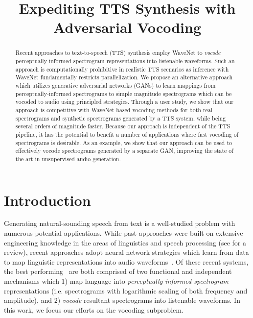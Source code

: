 \documentclass[a4paper]{article}
\title{Expediting TTS Synthesis with Adversarial Vocoding}
\begin{document}
\maketitle
% 
\begin{abstract}
Recent approaches to text-to-speech (TTS) synthesis employ WaveNet to \emph{vocode} perceptually-informed spectrogram representations into listenable waveforms. 
Such an approach is computationally prohibitive in realistic TTS scenarios as inference with WaveNet fundamentally restricts parallelization. 
We propose an alternative approach which utilizes generative adversarial networks (GANs) to learn mappings from perceptually-informed spectrograms to simple magnitude spectrograms which can be vocoded to audio using principled strategies. 
Through a user study, we show that our approach is competitive with WaveNet-based vocoding methods for both real spectrograms and synthetic spectrograms generated by a TTS system, while being several orders of magnitude faster. 
Because our approach is independent of the TTS pipeline, it has the potential to benefit a number of applications where fast vocoding of spectrograms is desirable. 
As an example, we show that our approach can be used to effectively vocode spectrograms generated by a separate GAN, improving the state of the art in unsupervised audio generation.
\end{abstract}


\section{Introduction}

Generating natural-sounding speech from text is a well-studied problem with numerous potential applications. 
While past approaches were built on extensive engineering knowledge in the areas of linguistics and speech processing  (see \cite{} for a review), 
recent approaches adopt neural network strategies which learn from data to map linguistic representations into audio waveforms~\cite{arik2017deep,gibiansky2017deep,ping2017deep,wang2017tacotron,shen2018natural}. 
Of these recent systems, 
the best performing~\cite{ping2017deep,shen2018natural} are both comprised of two functional and independent mechanisms which 
1) map language into \emph{perceptually-informed spectrogram} representations (i.e. spectrograms with logarithmic scaling of both frequency and amplitude), and 
2) \emph{vocode} resultant spectrograms into listenable waveforms. 
In this work, we focus our efforts on the vocoding subproblem.
\end{document}
